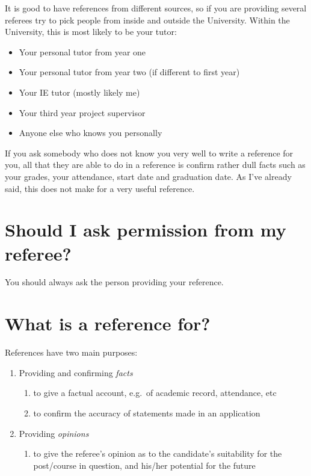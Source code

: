 \documentclass[
  12pt,
]{book}
\providecommand{\tightlist}{%
  \setlength{\itemsep}{0pt}\setlength{\parskip}{0pt}}
\begin{document}
It is good to have references from different sources, so if you are providing several referees try to pick people from inside and outside the University. Within the University, this is most likely to be your tutor:

\begin{itemize}
\tightlist
\item
  Your personal tutor from year one
\item
  Your personal tutor from year two (if different to first year)
\item
  Your IE tutor (mostly likely me)
\item
  Your third year project supervisor
\item
  Anyone else who knows you personally
\end{itemize}

If you ask somebody who does not know you very well to write a reference for you, all that they are able to do in a reference is confirm rather dull facts such as your grades, your attendance, start date and graduation date. As I've already said, this does not make for a very useful reference.

\hypertarget{should-i-ask-permission-from-my-referee}{%
\section{Should I ask permission from my referee?}\label{should-i-ask-permission-from-my-referee}}

You should always ask the person providing your reference.

\hypertarget{what-is-a-reference-for}{%
\section{What is a reference for?}\label{what-is-a-reference-for}}

References have two main purposes:

\begin{enumerate}
\def\labelenumi{\arabic{enumi}.}
\tightlist
\item
  Providing and confirming \emph{facts}

  \begin{enumerate}
  \def\labelenumii{\roman{enumii}.}
  \tightlist
  \item
    to give a factual account, e.g.~of academic record, attendance, etc
  \item
    to confirm the accuracy of statements made in an application
  \end{enumerate}
\item
  Providing \emph{opinions}

  \begin{enumerate}
  \def\labelenumii{\roman{enumii}.}
  \tightlist
  \item
    to give the referee's opinion as to the candidate's suitability for the post/course in
    question, and his/her potential for the future
  \end{enumerate}
\end{enumerate}
\end{document}

